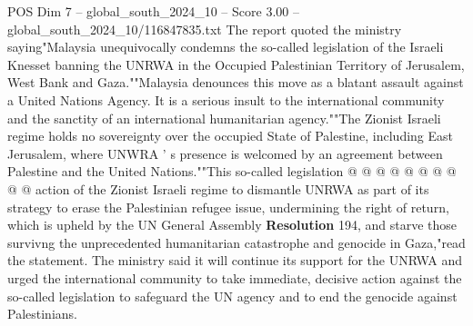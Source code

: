 \begin{textsample}{POS Dim 7 – global\_south\_2024\_10 – Score 3.00 – global\_south\_2024\_10/116847835.txt}
The report quoted the ministry saying"Malaysia unequivocally condemns the so-called legislation of the Israeli Knesset banning the UNRWA in the Occupied Palestinian Territory of Jerusalem, West Bank and Gaza.""Malaysia denounces this move as a blatant assault against a United Nations Agency.
It is a serious insult to the international community and the sanctity of an international humanitarian agency.""The Zionist Israeli regime holds no sovereignty over the occupied State of Palestine, including East Jerusalem, where UNWRA ' s presence is welcomed by an agreement between Palestine and the United Nations.""This so-called legislation @ @ @ @ @ @ @ @ @ @ action of the Zionist Israeli regime to dismantle UNRWA as part of its strategy to erase the Palestinian refugee issue, undermining the right of return, which is upheld by the UN General Assembly \textbf{Resolution} 194, and starve those survivng the unprecedented humanitarian catastrophe and genocide in Gaza,"read the statement.
The ministry said it will continue its support for the UNRWA and urged the international community to take immediate, decisive action against the so-called legislation to safeguard the UN agency and to end the genocide against Palestinians.

\end{textsample}
